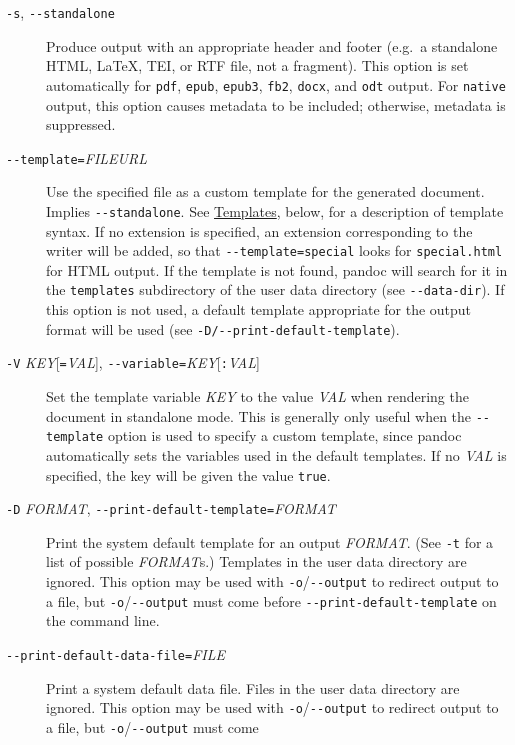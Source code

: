 \documentclass[
]{article}
\begin{document}
\begin{description}
\item[\texttt{-s}, \texttt{-\/-standalone}]
Produce output with an appropriate header and footer (e.g.~a standalone
HTML, LaTeX, TEI, or RTF file, not a fragment). This option is set
automatically for \texttt{pdf}, \texttt{epub}, \texttt{epub3},
\texttt{fb2}, \texttt{docx}, and \texttt{odt} output. For
\texttt{native} output, this option causes metadata to be included;
otherwise, metadata is suppressed.
\item[\texttt{-\/-template=}\emph{FILE}\textbar{}\emph{URL}]
Use the specified file as a custom template for the generated document.
Implies \texttt{-\/-standalone}. See
\protect\hyperlink{templates}{Templates}, below, for a description of
template syntax. If no extension is specified, an extension
corresponding to the writer will be added, so that
\texttt{-\/-template=special} looks for \texttt{special.html} for HTML
output. If the template is not found, pandoc will search for it in the
\texttt{templates} subdirectory of the user data directory (see
\texttt{-\/-data-dir}). If this option is not used, a default template
appropriate for the output format will be used (see
\texttt{-D/-\/-print-default-template}).
\item[\texttt{-V} \emph{KEY}{[}\texttt{=}\emph{VAL}{]},
\texttt{-\/-variable=}\emph{KEY}{[}\texttt{:}\emph{VAL}{]}]
Set the template variable \emph{KEY} to the value \emph{VAL} when
rendering the document in standalone mode. This is generally only useful
when the \texttt{-\/-template} option is used to specify a custom
template, since pandoc automatically sets the variables used in the
default templates. If no \emph{VAL} is specified, the key will be given
the value \texttt{true}.
\item[\texttt{-D} \emph{FORMAT},
\texttt{-\/-print-default-template=}\emph{FORMAT}]
Print the system default template for an output \emph{FORMAT}. (See
\texttt{-t} for a list of possible \emph{FORMAT}s.) Templates in the
user data directory are ignored. This option may be used with
\texttt{-o}/\texttt{-\/-output} to redirect output to a file, but
\texttt{-o}/\texttt{-\/-output} must come before
\texttt{-\/-print-default-template} on the command line.
\item[\texttt{-\/-print-default-data-file=}\emph{FILE}]
Print a system default data file. Files in the user data directory are
ignored. This option may be used with \texttt{-o}/\texttt{-\/-output} to
redirect output to a file, but \texttt{-o}/\texttt{-\/-output} must come

\end{description}
\end{document}
